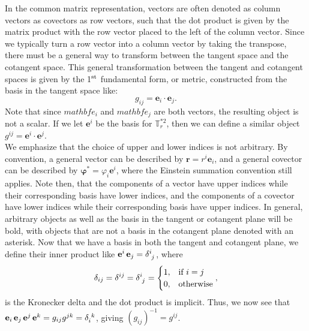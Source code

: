 \begin{appendices}
In the common matrix representation, vectors are often denoted as column vectors as covectors as row vectors, such that the dot product is given by the matrix product with the row vector placed to the left of the column vector.
Since we typically turn a row vector into a column vector by taking the transpose, there must be a general way to transform between the tangent space and the cotangent space.
This general transformation between the tangent and cotangent spaces is given by the 1$^{\rm st}$ fundamental form, or metric, constructed from the basis in the tangent space like:
\begin{equation}
  g_{ij} = \mathbf{e}_i \cdot \mathbf{e}_j.\label{e:A-metric}
\end{equation}
Note that since $mathbf{e}_i$ and $mathbf{e}_j$ are both vectors, the resulting object is not a scalar.
If we let $\mathbf{e}^i$ be the basis for $\mathbb{T}^{*2}_r$, then we can define a similar object $g^{ij} = \mathbf{e}^i \cdot \mathbf{e}^j$. \\

We emphasize that the choice of upper and lower indices is not arbitrary.
By convention, a general vector can be described by $\mathbf{r} = r^{i}\mathbf{e}_i$, and a general covector can be described by $\bm{\varphi}^* = \varphi_{i}\mathbf{e}^i$, where the Einstein summation convention still applies.
Note then, that the components of a vector have upper indices while their corresponding basis have lower indices, and the components of a covector have lower indices while their corresponding basis have upper indices.
In general, arbitrary objects as well as the basis in the tangent or cotangent plane will be bold, with objects that are not a basis in the cotangent plane denoted with an asterisk.
Now that we have a basis in both the tangent and cotangent plane, we define their inner product like $\mathbf{e}^i \, \mathbf{e}_j = \tensor{\delta}{^i_j}$, where
\begin{equation}
  \delta_{ij} = \delta^{ij} = \tensor{\delta}{^i_j} = \begin{cases}
    1, & \textrm{if } i = j \\
    0, & \textrm{otherwise}
  \end{cases},
\end{equation}
is the Kronecker delta and the dot product is implicit.
Thus, we now see that $\mathbf{e}_i \, \mathbf{e}_j \, \mathbf{e}^j \, \mathbf{e}^k = g_{ij}g^{jk} = \tensor{\delta}{_i^k}$, giving $(g_{ij})^{-1} = g^{ij}$. \\


\end{appendices}
